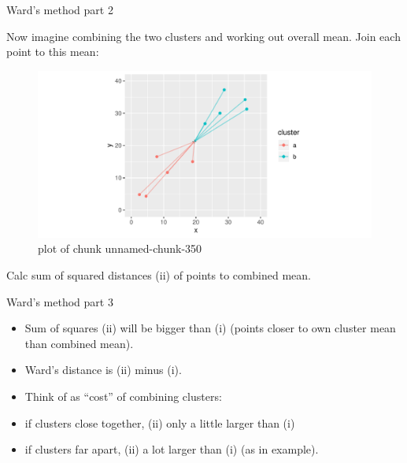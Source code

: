 \documentclass[ignorenonframetext,]{beamer}
\begin{document}
\begin{frame}{Ward's method part 2}
\protect\hypertarget{wards-method-part-2}{}

Now imagine combining the two clusters and working out overall mean.
Join each point to this mean:

\begin{figure}
\centering
\includegraphics{figure/unnamed-chunk-350-1.pdf}
\caption{plot of chunk unnamed-chunk-350}
\end{figure}

Calc sum of squared distances (ii) of points to combined mean.

\end{frame}

\begin{frame}{Ward's method part 3}
\protect\hypertarget{wards-method-part-3}{}

\begin{itemize}
\item
  Sum of squares (ii) will be bigger than (i) (points closer to own
  cluster mean than combined mean).
\item
  Ward's distance is (ii) minus (i).
\item
  Think of as ``cost'' of combining clusters:
\item
  if clusters close together, (ii) only a little larger than (i)
\item
  if clusters far apart, (ii) a lot larger than (i) (as in example).
\end{itemize}

\end{frame}
\end{document}
